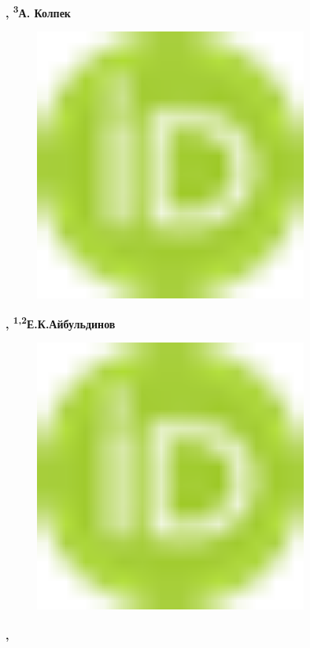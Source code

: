 {\bfseries \textsuperscript{\envelope },
\textsuperscript{3}А.
Колпек}
\begin{figure}[H]
	\centering
	\includegraphics[width=0.8\textwidth]{media/chem2/image1}
	\caption*{}
\end{figure}
{\bfseries ,
\textsuperscript{1,2}Е.К.Айбульдинов}
\begin{figure}[H]
	\centering
	\includegraphics[width=0.8\textwidth]{media/chem2/image1}
	\caption*{}
\end{figure}
{\bfseries \textsuperscript{\envelope },}

